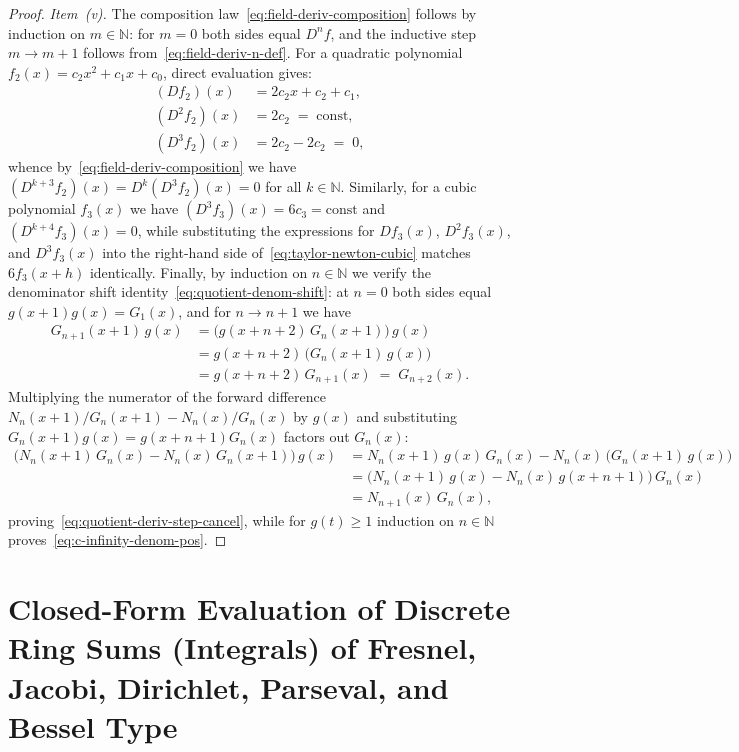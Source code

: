 \documentclass[11pt,a4paper]{article}
\theoremstyle{plain}
\theoremstyle{definition}
\begin{document}
\begin{proof}
\emph{Item~(v).} The composition law~\eqref{eq:field-deriv-composition} follows by induction on $m \in \mathbb{N}$: for $m = 0$ both sides equal $D^n f$, and the inductive step $m \to m + 1$ follows from~\eqref{eq:field-deriv-n-def}. For a quadratic polynomial $f_2(x) = c_2 x^2 + c_1 x + c_0$, direct evaluation gives:
\begin{align*}
  (Df_2)(x) &= 2c_2 x + c_2 + c_1, \\
  (D^2 f_2)(x) &= 2c_2 \;=\; \mathrm{const}, \\
  (D^3 f_2)(x) &= 2c_2 - 2c_2 \;=\; 0,
\end{align*}
whence by~\eqref{eq:field-deriv-composition} we have $(D^{k+3} f_2)(x) = D^k(D^3 f_2)(x) = 0$ for all $k \in \mathbb{N}$. Similarly, for a cubic polynomial $f_3(x)$ we have $(D^3 f_3)(x) = 6c_3 = \mathrm{const}$ and $(D^{k+4} f_3)(x) = 0$, while substituting the expressions for $Df_3(x)$, $D^2 f_3(x)$, and $D^3 f_3(x)$ into the right-hand side of~\eqref{eq:taylor-newton-cubic} matches $6 f_3(x+h)$ identically. Finally, by induction on $n \in \mathbb{N}$ we verify the denominator shift identity~\eqref{eq:quotient-denom-shift}: at $n = 0$ both sides equal $g(x+1)g(x) = G_1(x)$, and for $n \to n + 1$ we have
\begin{align*}
  G_{n+1}(x+1)\,g(x) &= \bigl(g(x+n+2)\,G_n(x+1)\bigr)\,g(x) \\
  &= g(x+n+2)\,\bigl(G_n(x+1)\,g(x)\bigr) \\
  &= g(x+n+2)\,G_{n+1}(x) \;=\; G_{n+2}(x).
\end{align*}
Multiplying the numerator of the forward difference $N_n(x+1)/G_n(x+1) - N_n(x)/G_n(x)$ by $g(x)$ and substituting $G_n(x+1)g(x) = g(x+n+1)G_n(x)$ factors out $G_n(x)$:
\begin{align*}
  \bigl(N_n(x+1)\,G_n(x) - N_n(x)\,G_n(x+1)\bigr)\,g(x)
  &= N_n(x+1)\,g(x)\,G_n(x) - N_n(x)\,\bigl(G_n(x+1)\,g(x)\bigr) \\
  &= \bigl(N_n(x+1)\,g(x) - N_n(x)\,g(x+n+1)\bigr)\,G_n(x) \\
  &= N_{n+1}(x)\,G_n(x),
\end{align*}
proving~\eqref{eq:quotient-deriv-step-cancel}, while for $g(t) \ge 1$ induction on $n \in \mathbb{N}$ proves~\eqref{eq:c-infinity-denom-pos}.
\end{proof}

\section{Closed-Form Evaluation of Discrete Ring Sums (Integrals) of Fresnel, Jacobi, Dirichlet, Parseval, and Bessel Type}
\label{sec:integrals}
\end{document}
